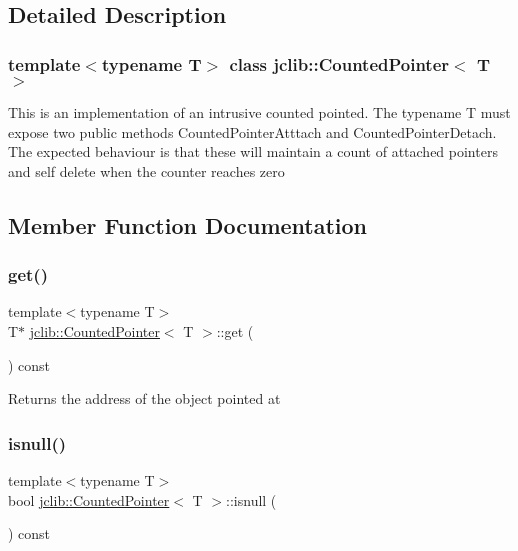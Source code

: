 \subsection{Detailed Description}
\subsubsection*{template$<$typename T$>$\newline
class jclib\+::\+Counted\+Pointer$<$ T $>$}

This is an implementation of an intrusive counted pointed. The typename T must expose two public methods Counted\+Pointer\+Atttach and Counted\+Pointer\+Detach. The expected behaviour is that these will maintain a count of attached pointers and self delete when the counter reaches zero 

\subsection{Member Function Documentation}
\mbox{\label{classjclib_1_1CountedPointer_ad01d75e50436f7ee6b389c80511465ae}} 
\subsubsection{\texorpdfstring{get()}{get()}}
{\footnotesize\ttfamily template$<$typename T$>$ \\
T$\ast$ \hyperlink{classjclib_1_1CountedPointer}{jclib\+::\+Counted\+Pointer}$<$ T $>$\+::get (\begin{DoxyParamCaption}{ }\end{DoxyParamCaption}) const\hspace{0.3cm}{\ttfamily [inline]}}

\begin{DoxyReturn}{Returns}
the address of the object pointed at 
\end{DoxyReturn}
\mbox{\label{classjclib_1_1CountedPointer_a45787c3b235590582aad6103d7bdc5d0}} 
\subsubsection{\texorpdfstring{isnull()}{isnull()}}
{\footnotesize\ttfamily template$<$typename T$>$ \\
bool \hyperlink{classjclib_1_1CountedPointer}{jclib\+::\+Counted\+Pointer}$<$ T $>$\+::isnull (\begin{DoxyParamCaption}{ }\end{DoxyParamCaption}) const\hspace{0.3cm}{\ttfamily [inline]}}

